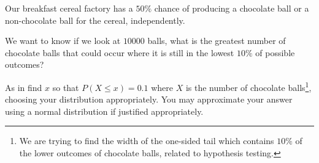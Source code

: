 \begin{example}
    Our breakfast cereal factory has a $50\%$ chance of producing a chocolate ball or a non-chocolate ball for the cereal, independently. 

    We want to know if we look at $10000$ balls, what is the greatest number of chocolate balls that could occur where it is still in the lowest $10\%$ of possible outcomes?

    As in find $x$ so that $P(X\leq x)=0.1$ where $X$ is the number of chocolate balls\footnote{We are trying to find the width of the one-sided tail which contains $10\%$ of the lower outcomes of chocolate balls, related to hypothesis testing.}, choosing your distribution appropriately. You may approximate your answer using a normal distribution if justified appropriately.
\end{example}
